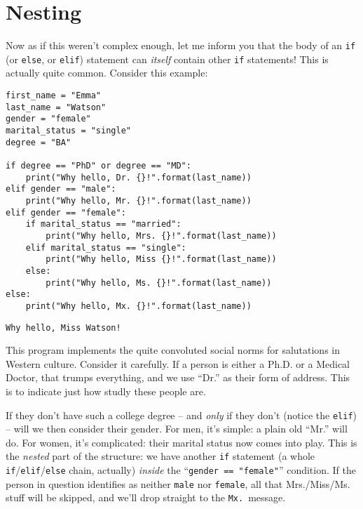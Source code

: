 \section{Nesting}


Now as if this weren't complex enough, let me inform you that the body of an
\texttt{if} (or \texttt{else}, or \texttt{elif}) statement can \textit{itself}
contain other \texttt{if} statements! This is actually quite common. Consider
this example:


\begin{Verbatim}[fontsize=\small,samepage=true,frame=single,framesep=3mm]
first_name = "Emma"
last_name = "Watson"
gender = "female"
marital_status = "single"
degree = "BA"

if degree == "PhD" or degree == "MD":
    print("Why hello, Dr. {}!".format(last_name))
elif gender == "male":
    print("Why hello, Mr. {}!".format(last_name))
elif gender == "female":
    if marital_status == "married":
        print("Why hello, Mrs. {}!".format(last_name))
    elif marital_status == "single":
        print("Why hello, Miss {}!".format(last_name))
    else:
        print("Why hello, Ms. {}!".format(last_name))
else:
    print("Why hello, Mx. {}!".format(last_name))
\end{Verbatim}
\vspace{-.2in}

\begin{Verbatim}[fontsize=\small,samepage=true,frame=leftline,framesep=5mm,framerule=1mm]
Why hello, Miss Watson!
\end{Verbatim}

This program implements the quite convoluted social norms for salutations in
Western culture. Consider it carefully. If a person is either a Ph.D. or a
Medical Doctor, that trumps everything, and we use ``Dr.'' as their form of
address. This is to indicate just how studly these people are.

If they don't have such a college degree -- and \textit{only} if they don't
(notice the \texttt{elif}) -- will we then consider their gender. For men, it's
simple: a plain old ``Mr.'' will do. For women, it's complicated: their marital
status now comes into play. This is the \textit{nested} part of the structure:
we have another \texttt{if} statement (a whole
\texttt{if}/\texttt{elif}/\texttt{else} chain, actually) \textit{inside} the
``\texttt{gender == "female"}'' condition. If the person in question identifies
as neither \texttt{male} nor \texttt{female}, all that Mrs./Miss/Ms. stuff will
be skipped, and we'll drop straight to the \texttt{Mx.}~message.

